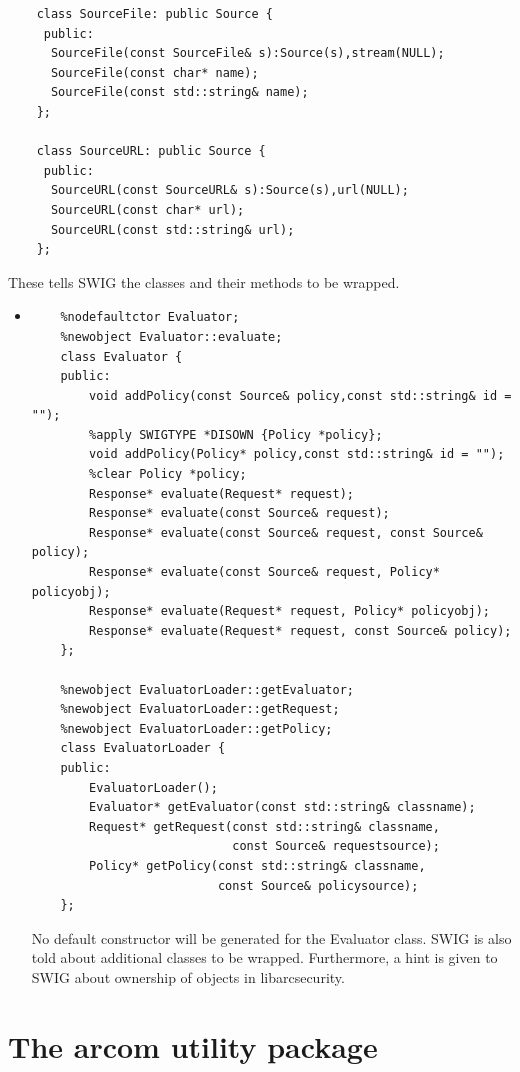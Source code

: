 \documentclass{article}
\begin{document}
\begin{flushleft}
\begin{itemize}
{\begin{verbatim}
    class SourceFile: public Source {
     public:
      SourceFile(const SourceFile& s):Source(s),stream(NULL);
      SourceFile(const char* name);
      SourceFile(const std::string& name);
    };

    class SourceURL: public Source {
     public:
      SourceURL(const SourceURL& s):Source(s),url(NULL);
      SourceURL(const char* url);
      SourceURL(const std::string& url);
    };
  \end{verbatim}
  }
  These tells SWIG the classes and their methods to be wrapped.
\end{itemize}
\begin{itemize}
  \item{ \begin{verbatim}
    %nodefaultctor Evaluator;
    %newobject Evaluator::evaluate;
    class Evaluator {
    public:
        void addPolicy(const Source& policy,const std::string& id = "");
        %apply SWIGTYPE *DISOWN {Policy *policy};
        void addPolicy(Policy* policy,const std::string& id = "");
        %clear Policy *policy;
        Response* evaluate(Request* request);
        Response* evaluate(const Source& request);
        Response* evaluate(const Source& request, const Source& policy);
        Response* evaluate(const Source& request, Policy* policyobj);
        Response* evaluate(Request* request, Policy* policyobj);
        Response* evaluate(Request* request, const Source& policy);
    };

    %newobject EvaluatorLoader::getEvaluator;
    %newobject EvaluatorLoader::getRequest;
    %newobject EvaluatorLoader::getPolicy;
    class EvaluatorLoader {
    public:
        EvaluatorLoader();
        Evaluator* getEvaluator(const std::string& classname);
        Request* getRequest(const std::string& classname, 
                            const Source& requestsource);
        Policy* getPolicy(const std::string& classname, 
                          const Source& policysource);
    };
  \end{verbatim}
  No default constructor will be generated for the Evaluator class. \linebreak
  SWIG is also told about additional classes to be wrapped. 
  Furthermore, a hint is given to SWIG about ownership of objects in libarcsecurity.
  }
\end{itemize}
\end{flushleft}

\newpage

\section{The arcom utility package}
\end{document}
